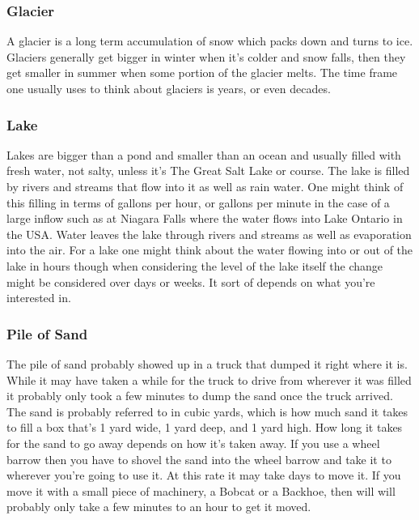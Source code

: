 \documentclass[]{memoir}
\begin{document}
\subsubsection{Glacier}

A glacier is a long term accumulation of snow which packs down and turns
to ice. Glaciers generally get bigger in winter when it's colder and
snow falls, then they get smaller in summer when some portion of the
glacier melts. The time frame one usually uses to think about glaciers
is years, or even decades.

\subsubsection{Lake}

Lakes are bigger than a pond and smaller than an ocean and usually
filled with fresh water, not salty, unless it's The Great Salt Lake or
course. The lake is filled by rivers and streams that flow into it as
well as rain water. One might think of this filling in terms of gallons
per hour, or gallons per minute in the case of a large inflow such as at
Niagara Falls where the water flows into Lake Ontario in the USA. Water
leaves the lake through rivers and streams as well as evaporation into
the air. For a lake one might think about the water flowing into or out
of the lake in hours though when considering the level of the lake
itself the change might be considered over days or weeks. It sort of
depends on what you're interested in.

\subsubsection{Pile of Sand}

The pile of sand probably showed up in a truck that dumped it right
where it is. While it may have taken a while for the truck to drive from
wherever it was filled it probably only took a few minutes to dump the
sand once the truck arrived. The sand is probably referred to in cubic
yards, which is how much sand it takes to fill a box that's 1 yard wide,
1 yard deep, and 1 yard high. How long it takes for the sand to go away
depends on how it's taken away. If you use a wheel barrow then you have
to shovel the sand into the wheel barrow and take it to wherever you're
going to use it. At this rate it may take days to move it. If you move
it with a small piece of machinery, a Bobcat or a Backhoe, then will
will probably only take a few minutes to an hour to get it moved.
\end{document}
